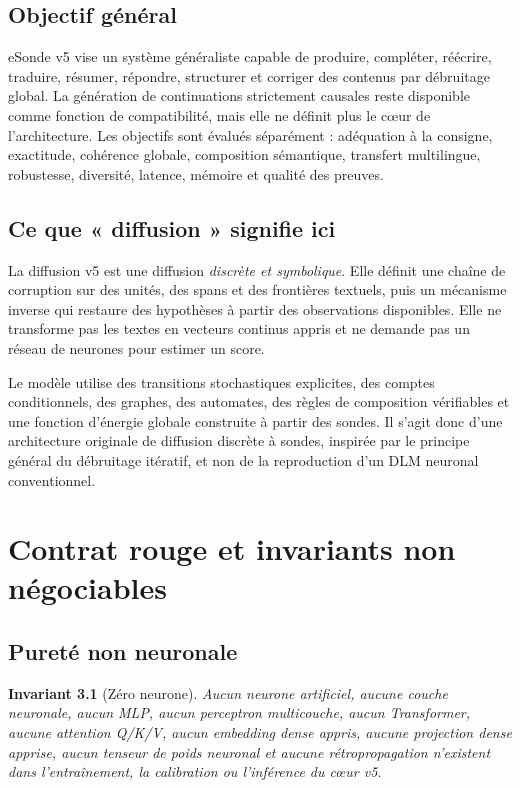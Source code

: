 \documentclass[11pt,a4paper,oneside]{report}
\newtheorem{invariant}[definition]{Invariant}
\begin{document}
\section{Objectif général}
eSonde v5 vise un système généraliste capable de produire, compléter, réécrire, traduire, résumer, répondre, structurer et corriger des contenus par débruitage global. La génération de continuations strictement causales reste disponible comme fonction de compatibilité, mais elle ne définit plus le cœur de l'architecture. Les objectifs sont évalués séparément : adéquation à la consigne, exactitude, cohérence globale, composition sémantique, transfert multilingue, robustesse, diversité, latence, mémoire et qualité des preuves.

\section{Ce que « diffusion » signifie ici}
La diffusion v5 est une diffusion \emph{discrète et symbolique}. Elle définit une chaîne de corruption sur des unités, des spans et des frontières textuels, puis un mécanisme inverse qui restaure des hypothèses à partir des observations disponibles. Elle ne transforme pas les textes en vecteurs continus appris et ne demande pas un réseau de neurones pour estimer un score.

Le modèle utilise des transitions stochastiques explicites, des comptes conditionnels, des graphes, des automates, des règles de composition vérifiables et une fonction d'énergie globale construite à partir des sondes. Il s'agit donc d'une architecture originale de diffusion discrète à sondes, inspirée par le principe général du débruitage itératif, et non de la reproduction d'un DLM neuronal conventionnel.

\chapter{Contrat rouge et invariants non négociables}
\section{Pureté non neuronale}
\begin{invariant}[Zéro neurone]
Aucun neurone artificiel, aucune couche neuronale, aucun MLP, aucun perceptron multicouche, aucun Transformer, aucune attention Q/K/V, aucun embedding dense appris, aucune projection dense apprise, aucun tenseur de poids neuronal et aucune rétropropagation n'existent dans l'entraînement, la calibration ou l'inférence du cœur v5.
\end{invariant}
\end{document}
